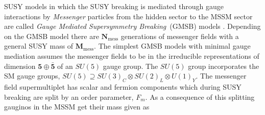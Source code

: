 SUSY models in which the SUSY breaking is mediated through gauge interactions by \textit{Messenger} particles from the hidden sector to the MSSM sector are called \textit{Gauge Mediated Supersymmetry Breaking}~(GMSB) models \cite{GMSB}. Depending on the GMSB model there are $\mathbf{N}_{\mbox{mess}}$ generations of messenger fields with a general SUSY mass  of $\mathbf{M}_{\mbox{mess}}$. The simplest GMSB models with minimal gauge mediation assumes the messenger fields to be in the irreducible representations of dimension $\mathbf{5} \oplus \bar{\mathbf{5}}$  of an $SU(5)$ gauge group. The  $SU(5)$ group incorporates the SM gauge groups,  $SU(5) \supseteq  SU(3)_{C} \otimes SU(2)_{L} \otimes U(1)_{Y}$. The messenger field supermultiplet has scalar and fermion components which during SUSY breaking are split by an order parameter, $F_{m}$. As a consequence of this splitting gauginos in the MSSM get their mass  given as 

